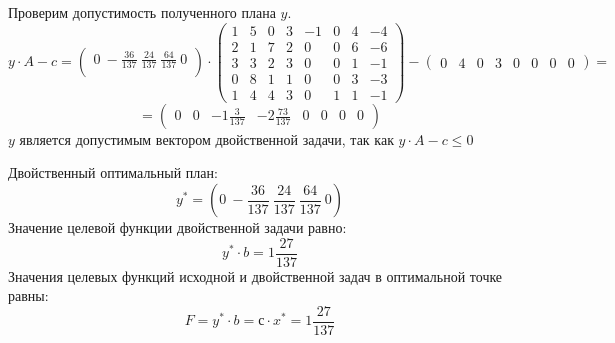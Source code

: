 \documentclass{article}
\begin{document}
Проверим допустимость полученного плана $y$.
\begin{equation*}
    y \cdot A - c = 
\begin{pmatrix}
    0~-\frac{36}{137}~\frac{24}{137}~\frac{64}{137}~0\\
 \end{pmatrix}
 \cdot 
\begin{pmatrix}
1 & 5 & 0 & 3 & -1 & 0 & 4 & -4\\
2 & 1 & 7 & 2 & 0 & 0 & 6 & -6\\
3 & 3 & 2 & 3 & 0 & 0 & 1 & -1\\
0 & 8 & 1 & 1 & 0 & 0 & 3 & -3\\
1 & 4 & 4 &3 & 0 & 1 & 1 & -1
\end{pmatrix}
- 
\begin{pmatrix}
0 & 4 & 0 & 3 & 0 & 0 & 0 & 0
\end{pmatrix}
=
\end{equation*}
\begin{equation*}
    =
    \begin{pmatrix}
    0 & 0 & -1\frac{3}{137} & -2\frac{73}{137} & 0 & 0 & 0 & 0
    \end{pmatrix}
\end{equation*}
$y$ является допустимым  вектором двойственной задачи, так как $y \cdot A - c \le 0$


\noindent Двойственный оптимальный план: 
$$y^{*}= (0~-\frac{36}{137}~\frac{24}{137}~\frac{64}{137}~0)$$
Значение целевой функции двойственной задачи равно:
$$y^{*} \cdot b = 1\frac{27}{137}$$
Значения целевых функций исходной и двойственной задач в оптимальной точке равны:
$$F=y^{*} \cdot b = с \cdot x^{*}=1\frac{27}{137}$$
\end{document}
